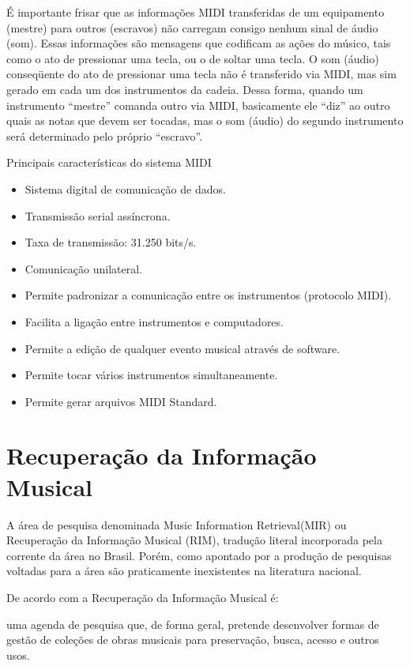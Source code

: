 É importante frisar que as informações MIDI transferidas de um equipamento (mestre) para outros (escravos) não carregam consigo nenhum sinal de áudio (som). Essas informações são mensagens que codificam as ações do músico, tais como o ato de pressionar uma tecla, ou o de soltar uma tecla. O som (áudio) conseqüente do ato de pressionar uma tecla não é transferido via MIDI, mas sim gerado em cada um dos instrumentos da cadeia. Dessa forma, quando um instrumento “mestre” comanda outro via MIDI, basicamente ele “diz” ao outro quais as notas que devem ser tocadas, mas o som (áudio) do segundo instrumento será determinado pelo próprio “escravo”.

Principais características do sistema MIDI

\begin{itemize}
    \item Sistema digital de comunicação de dados.
    \item Transmissão serial assíncrona.
    \item Taxa de transmissão: 31.250 bits/s.
    \item Comunicação unilateral.
    \item Permite padronizar a comunicação entre os instrumentos (protocolo MIDI).
    \item Facilita a ligação entre instrumentos e computadores.
    \item Permite a edição de qualquer evento musical através de software.
    \item Permite tocar vários instrumentos simultaneamente.
    \item Permite gerar arquivos MIDI Standard.
\end{itemize}

\section{Recuperação da Informação Musical}

A área de pesquisa denominada Music Information Retrieval(MIR) ou Recuperação da Informação Musical (RIM), tradução literal incorporada pela corrente da área no Brasil. Porém, como apontado por  a produção de pesquisas voltadas para a área são praticamente inexistentes na literatura nacional.

De acordo com  a Recuperação da Informação Musical é:

\begin{citacao}
[...] uma agenda de pesquisa que, de forma geral, pretende desenvolver formas de gestão de coleções de obras musicais para preservação, busca, acesso e outros usos.
\end{citacao}

